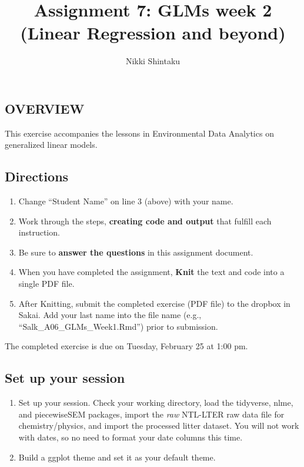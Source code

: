 \documentclass[]{article}
\title{Assignment 7: GLMs week 2 (Linear Regression and beyond)}
\author{Nikki Shintaku}
\date{}
\providecommand{\tightlist}{%
  \setlength{\itemsep}{0pt}\setlength{\parskip}{0pt}}
\begin{document}
\maketitle

\hypertarget{overview}{%
\subsection{OVERVIEW}\label{overview}}

This exercise accompanies the lessons in Environmental Data Analytics on
generalized linear models.

\hypertarget{directions}{%
\subsection{Directions}\label{directions}}

\begin{enumerate}
\def\labelenumi{\arabic{enumi}.}
\tightlist
\item
  Change ``Student Name'' on line 3 (above) with your name.
\item
  Work through the steps, \textbf{creating code and output} that fulfill
  each instruction.
\item
  Be sure to \textbf{answer the questions} in this assignment document.
\item
  When you have completed the assignment, \textbf{Knit} the text and
  code into a single PDF file.
\item
  After Knitting, submit the completed exercise (PDF file) to the
  dropbox in Sakai. Add your last name into the file name (e.g.,
  ``Salk\_A06\_GLMs\_Week1.Rmd'') prior to submission.
\end{enumerate}

The completed exercise is due on Tuesday, February 25 at 1:00 pm.

\hypertarget{set-up-your-session}{%
\subsection{Set up your session}\label{set-up-your-session}}

\begin{enumerate}
\def\labelenumi{\arabic{enumi}.}
\item
  Set up your session. Check your working directory, load the tidyverse,
  nlme, and piecewiseSEM packages, import the \emph{raw} NTL-LTER raw
  data file for chemistry/physics, and import the processed litter
  dataset. You will not work with dates, so no need to format your date
  columns this time.
\item
  Build a ggplot theme and set it as your default theme.
\end{enumerate}
\end{document}
